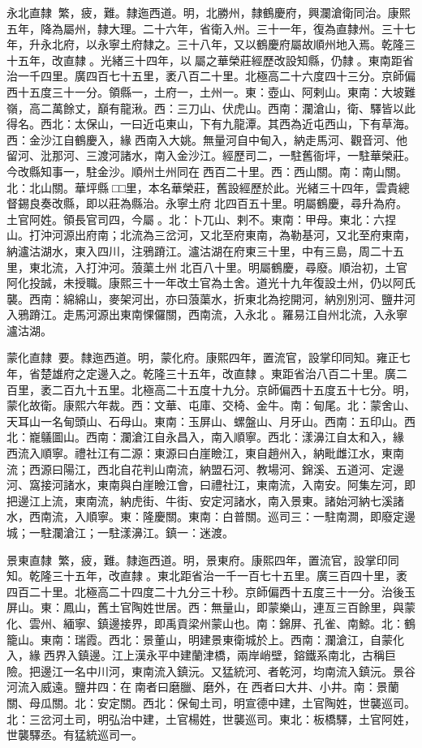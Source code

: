 \begin{pinyinscope}
永北直隸：繁，疲，難。隸迤西道。明，北勝州，隸鶴慶府，興瀾滄衛同治。康熙五年，降為屬州，隸大理。二十六年，省衛入州。三十一年，復為直隸州。三十七年，升永北府，以永寧土府隸之。三十八年，又以鶴慶府屬故順州地入焉。乾隆三十五年，改直隸。光緒三十四年，以屬之華榮莊經歷改設知縣，仍隸。東南距省治一千四里。廣四百七十五里，袤八百二十里。北極高二十六度四十三分。京師偏西十五度三十一分。領縣一，土府一，土州一。東：壺山、阿剌山。東南：大坡難嶺，高二萬餘丈，巔有龍湫。西：三刀山、伏虎山。西南：瀾滄山，衛、驛皆以此得名。西北：太保山，一曰近屯東山，下有九龍潭。其西為近屯西山，下有草海。西：金沙江自鶴慶入，緣西南入大姚。無量河自中甸入，納走馬河、觀音河、他留河、沘那河、三渡河諸水，南入金沙江。經歷司二，一駐舊衙坪，一駐華榮莊。今改縣知事一，駐金沙。順州土州同在西百二十里。西：西山關。南：南山關。北：北山關。華坪縣□□里，本名華榮莊，舊設經歷於此。光緒三十四年，雲貴總督錫良奏改縣，即以莊為縣治。永寧土府北四百五十里。明屬鶴慶，尋升為府。土官阿姓。領長官司四，今屬。北：卜兀山、剌不。東南：甲母。東北：六捏山。打沖河源出府南；北流為三岔河，又北至府東南，為勒基河，又北至府東南，納瀘沽湖水，東入四川，注鴉蹐江。瀘沽湖在府東三十里，中有三島，周二十五里，東北流，入打沖河。蒗蕖土州北百八十里。明屬鶴慶，尋廢。順治初，土官阿化投誠，未授職。康熙三十一年改土官為土舍。道光十九年復設土州，仍以阿氏襲。西南：綿綿山，麥架河出，亦曰蒗蕖水，折東北為挖開河，納別別河、鹽井河入鴉蹐江。走馬河源出東南惈儸關，西南流，入永北。羅易江自州北流，入永寧瀘沽湖。

蒙化直隸：要。隸迤西道。明，蒙化府。康熙四年，置流官，設掌印同知。雍正七年，省楚雄府之定邊入之。乾隆三十五年，改直隸。東距省治八百二十里。廣二百里，袤二百九十五里。北極高二十五度十九分。京師偏西十五度五十七分。明，蒙化故衛。康熙六年裁。西：文華、屯庫、交椅、金牛。南：甸尾。北：蒙舍山、天耳山一名甸頭山、石母山。東南：玉屏山、螺盤山、月牙山。西南：五印山。西北：巃鸃圖山。西南：瀾滄江自永昌入，南入順寧。西北：漾濞江自太和入，緣西流入順寧。禮社江有二源：東源曰白崖瞼江，東自趙州入，納毗雌江水，東南流；西源曰陽江，西北自花判山南流，納盟石河、教場河、錦溪、五道河、定邊河、窩接河諸水，東南與白崖瞼江會，曰禮社江，東南流，入南安。阿集左河，即把邊江上流，東南流，納虎街、牛街、安定河諸水，南入景東。諸始河納七溪諸水，西南流，入順寧。東：隆慶關。東南：白普關。巡司三：一駐南澗，即廢定邊城；一駐瀾滄江；一駐漾濞江。鎮一：迷渡。

景東直隸：繁，疲，難。隸迤西道。明，景東府。康熙四年，置流官，設掌印同知。乾隆三十五年，改直隸。東北距省治一千一百七十五里。廣三百四十里，袤四百二十里。北極高二十四度二十九分三十秒。京師偏西十五度三十一分。治後玉屏山。東：鳳山，舊土官陶姓世居。西：無量山，即蒙樂山，連亙三百餘里，與蒙化、雲州、緬寧、鎮邊接界，即禹貢梁州蒙山也。南：錦屏、孔雀、南鯨。北：鶴籠山。東南：瑞霞。西北：景董山，明建景東衛城於上。西南：瀾滄江，自蒙化入，緣西界入鎮邊。江上漢永平中建蘭津橋，兩岸峭壁，鎔鐵系南北，古稱巨險。把邊江一名中川河，東南流入鎮沅。又猛統河、者乾河，均南流入鎮沅。景谷河流入威遠。鹽井四：在南者曰磨臘、磨外，在西者曰大井、小井。南：景蘭關、母瓜關。北：安定關。西北：保甸土司，明宣德中建，土官陶姓，世襲巡司。北：三岔河土司，明弘治中建，土官楊姓，世襲巡司。東北：板橋驛，土官阿姓，世襲驛丞。有猛統巡司一。


\end{pinyinscope}
